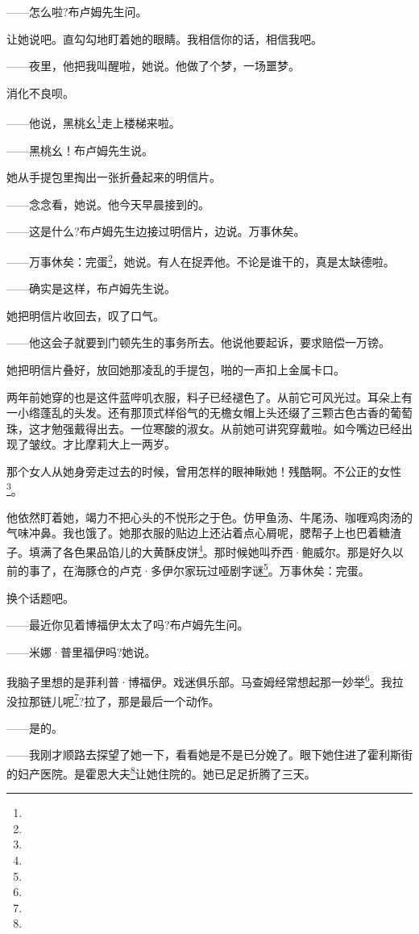 \par ——怎么啦?布卢姆先生问。
\par 让她说吧。直勾勾地盯着她的眼睛。我相信你的话，相信我吧。
\par ——夜里，他把我叫醒啦，她说。他做了个梦，一场噩梦。
\par 消化不良呗。
\par ——他说，黑桃幺\footnote{}走上楼梯来啦。
\par ——黑桃幺！布卢姆先生说。
\par 她从手提包里掏出一张折叠起来的明信片。
\par ——念念看，她说。他今天早晨接到的。
\par ——这是什么?布卢姆先生边接过明信片，边说。万事休矣。
\par ——万事休矣：完蛋\footnote{}，她说。有人在捉弄他。不论是谁干的，真是太缺德啦。
\par ——确实是这样，布卢姆先生说。
\par 她把明信片收回去，叹了口气。
\par ——他这会子就要到门顿先生的事务所去。他说他要起诉，要求赔偿一万镑。
\par 她把明信片叠好，放回她那凌乱的手提包，啪的一声扣上金属卡口。
\par 两年前她穿的也是这件蓝哔叽衣服，料子已经褪色了。从前它可风光过。耳朵上有一小绺蓬乱的头发。还有那顶式样俗气的无檐女帽上头还缀了三颗古色古香的葡萄珠，这才勉强戴得出去。一位寒酸的淑女。从前她可讲究穿戴啦。如今嘴边已经出现了皱纹。才比摩莉大上一两岁。
\par 那个女人从她身旁走过去的时候，曾用怎样的眼神瞅她！残酷啊。不公正的女性\footnote{}。
\par 他依然盯着她，竭力不把心头的不悦形之于色。仿甲鱼汤、牛尾汤、咖喱鸡肉汤的气味冲鼻。我也饿了。她那衣服的贴边上还沾着点心屑呢，腮帮子上也巴着糖渣子。填满了各色果品馅儿的大黄酥皮饼\footnote{}。那时候她叫乔西·鲍威尔。那是好久以前的事了，在海豚仓的卢克·多伊尔家玩过哑剧字谜\footnote{}。万事休矣：完蛋。
\par 换个话题吧。
\par ——最近你见着博福伊太太了吗?布卢姆先生问。
\par ——米娜·普里福伊吗?她说。
\par 我脑子里想的是菲利普·博福伊。戏迷俱乐部。马查姆经常想起那一妙举\footnote{}。我拉没拉那链儿呢\footnote{}?拉了，那是最后一个动作。
\par ——是的。
\par ——我刚才顺路去探望了她一下，看看她是不是已分娩了。眼下她住进了霍利斯街的妇产医院。是霍恩大夫\footnote{}让她住院的。她已足足折腾了三天。
